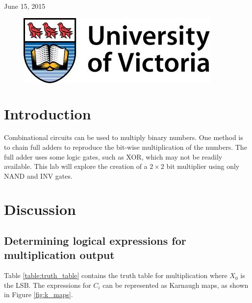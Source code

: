 \documentclass[11pt]{article}
\begin{document}
\begin{titlepage}
{\large June 15, 2015}\\ %

\begin{figure}[b]	 %
	\centering
	\includegraphics[scale=0.3]{UVic_logo}
\end{figure}

\end{titlepage}


\section{Introduction}
Combinational circuits can be used to multiply binary numbers. One method is to chain full adders to reproduce the bit-wise multiplication of the numbers. The full adder uses some logic gates, such as XOR, which may not be readily available. This lab will explore the creation of a $2 \times 2$ bit multiplier using only NAND and INV gates.

\section{Discussion}
\subsection{Determining logical expressions for multiplication output}
Table \ref{table:truth_table} contains the truth table for multiplication where $X_0$ is the LSB. The expressions for $C_i$ can be represented as Karnaugh maps, as shown in Figure \ref{fig:k_maps}.
\end{document}
